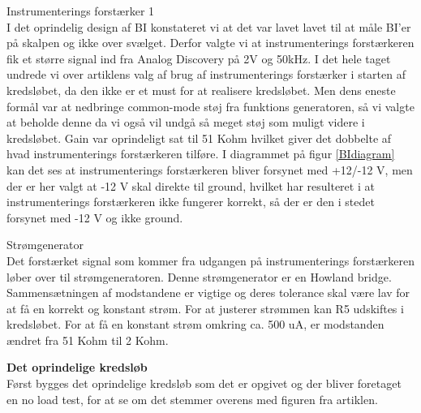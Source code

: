 Instrumenterings forstærker 1\\
I det oprindelig design af BI konstateret vi at det var lavet lavet til at måle BI'er på skalpen og ikke over svælget. Derfor valgte vi at instrumenterings forstærkeren fik et større signal ind fra Analog Discovery på 2V og 50kHz. I det hele taget undrede vi over artiklens valg af brug af instrumenterings forstærker i starten af kredsløbet, da den ikke er et must for at realisere kredsløbet. Men dens eneste formål var at nedbringe common-mode støj fra funktions generatoren, så vi valgte at beholde denne da vi også vil undgå så meget støj som muligt videre i kredsløbet. Gain var oprindeligt sat til 51 Kohm hvilket giver det dobbelte af hvad instrumenterings forstærkeren tilføre. I diagrammet på figur \ref{BIdiagram} kan det ses at instrumenterings forstærkeren bliver forsynet med +12/-12 V, men der er her valgt at -12 V skal direkte til ground, hvilket har resulteret i at instrumenterings forstærkeren ikke fungerer korrekt, så der er den i stedet forsynet med -12 V og ikke ground.  





Strømgenerator\\
Det forstærket signal som kommer fra udgangen på instrumenterings forstærkeren løber over til strømgeneratoren. Denne strømgenerator er en Howland bridge. Sammensætningen af modstandene er vigtige og deres tolerance skal være lav for at få en korrekt og konstant strøm. For at justerer strømmen kan R5 udskiftes i kredsløbet. For at få en konstant strøm omkring ca. 500 uA, er modstanden ændret fra 51 Kohm til 2 Kohm.  

\textbf{Det oprindelige kredsløb}\\
Først bygges det oprindelige kredsløb som det er opgivet og der bliver foretaget en no load test, for at se om det stemmer overens med figuren fra artiklen.

